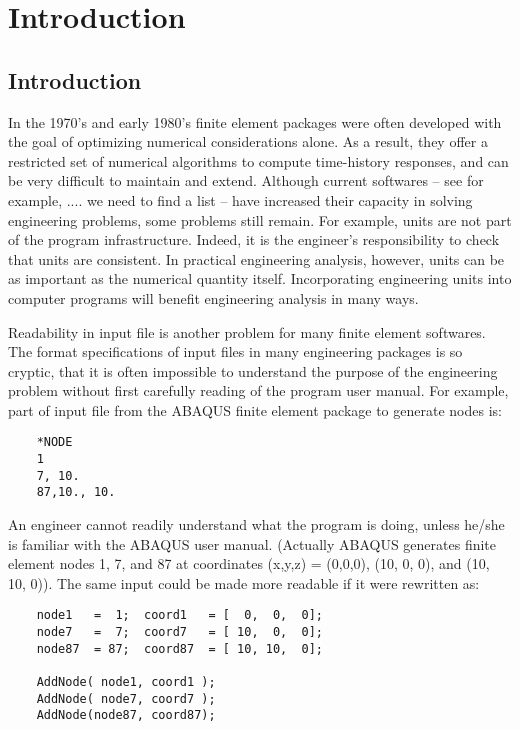 
\chapter{Introduction}

\section{Introduction}

\vspace{0.15 in}
\noindent\hspace{0.5 in}
In the 1970's and early 1980's finite element packages were
often developed with the goal of optimizing numerical considerations alone.
As a result, they offer a restricted set of numerical algorithms to compute
time-history responses, and can be very difficult to maintain and extend.
Although current softwares -- see for example, .... we need to find a list --
have increased their capacity in solving engineering problems, some problems still remain.
For example, units are not part of the program infrastructure.
Indeed, it is the engineer's responsibility to check that units are consistent.
In practical engineering analysis, however, units can be as important
as the numerical quantity itself. Incorporating engineering units into computer programs will
benefit engineering analysis in many ways. 

\vspace{0.15 in}
\noindent\hspace{0.5 in}
Readability in input file is another problem for many finite element softwares.
The format specifications of input files in 
many engineering packages is so cryptic, that it is often impossible to
understand the purpose of the engineering problem without first
carefully reading of the program user manual.
For example, part of input file from the ABAQUS \cite{abaqus92} finite
element package to generate nodes is:

\begin{footnotesize} 
\begin{verbatim}
    *NODE
    1
    7, 10.
    87,10., 10.
\end{verbatim}
\end{footnotesize} 

\noindent\hspace{0.5 in}
An engineer cannot readily understand what the program is doing, 
unless he/she is familiar with the ABAQUS user manual. (Actually ABAQUS generates
finite element nodes 1, 7, and 87 at coordinates (x,y,z) = (0,0,0),
(10, 0, 0), and (10, 10, 0)). The same input could be made more
readable if it were rewritten as:
\begin{footnotesize} 
\begin{verbatim}
    node1   =  1;  coord1   = [  0,  0,  0];
    node7   =  7;  coord7   = [ 10,  0,  0]; 
    node87  = 87;  coord87  = [ 10, 10,  0];

    AddNode( node1, coord1 );
    AddNode( node7, coord7 );
    AddNode(node87, coord87);
\end{verbatim}
\end{footnotesize} 

